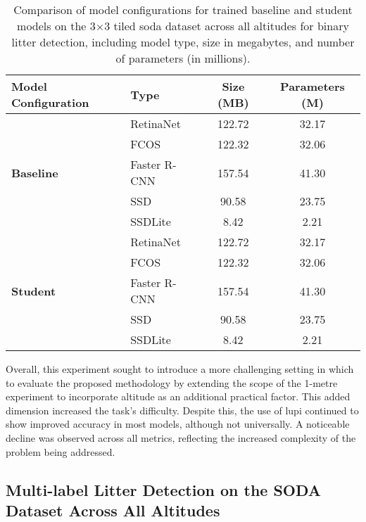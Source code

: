 \begin{table}[!ht]
    \centering
    \begin{tabular}{llcc}
        \toprule
        \textbf{Model Configuration} & \textbf{Type} & \textbf{Size (MB)} & \textbf{Parameters (M)} \\
        \midrule
        \multirow{5}{*}{\textbf{Baseline}} 
            & RetinaNet     & 122.72 & 32.17 \\
            & FCOS          & 122.32 & 32.06 \\
            & Faster R-CNN  & 157.54 & 41.30 \\
            & SSD           & 90.58  & 23.75 \\
            & SSDLite       & 8.42   & 2.21 \\
        \midrule
        \multirow{5}{*}{\textbf{Student}} 
            & RetinaNet     & 122.72 & 32.17 \\
            & FCOS          & 122.32 & 32.06 \\
            & Faster R-CNN  & 157.54 & 41.30 \\
            & SSD           & 90.58  & 23.75 \\
            & SSDLite       & 8.42   & 2.21 \\
        \bottomrule
    \end{tabular}
    \caption{Comparison of model configurations for trained baseline and student models on the 3$\times$3 tiled \gls{soda} dataset across all altitudes for binary litter detection, including model type, size in megabytes, and number of parameters (in millions).}
    \label{tab:model_configs_soda_tiled_single}
\end{table}

Overall, this experiment sought to introduce a more challenging setting in which to evaluate the proposed methodology by extending the scope of the 1-metre experiment to incorporate altitude as an additional practical factor. This added dimension increased the task's difficulty. Despite this, the use of \gls{lupi} continued to show improved accuracy in most models, although not universally. A noticeable decline was observed across all metrics, reflecting the increased complexity of the problem being addressed.


\subsection{Multi-label Litter Detection on the SODA Dataset Across All Altitudes}
\label{subsec:5_soda_tiled_multi_dataset_exp}

